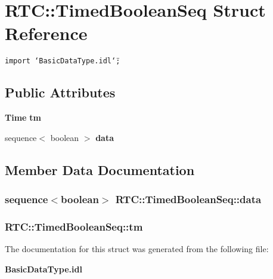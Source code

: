 \section{RTC::Timed\-Boolean\-Seq Struct Reference}
\label{structRTC_1_1TimedBooleanSeq}
{\tt import \char`\"{}Basic\-Data\-Type.idl\char`\"{};}

\subsection*{Public Attributes}
\begin{CompactItemize}
\item 
{\bf Time} {\bf tm}
\item 
sequence$<$ boolean $>$ {\bf data}
\end{CompactItemize}


\subsection{Member Data Documentation}
\subsubsection{\setlength{\rightskip}{0pt plus 5cm}sequence$<$boolean$>$ {\bf RTC::Timed\-Boolean\-Seq::data}}\label{structRTC_1_1TimedBooleanSeq_RTC_1_1TimedBooleanSeqo1}


\subsubsection{ {\bf RTC::Timed\-Boolean\-Seq::tm}}\label{structRTC_1_1TimedBooleanSeq_RTC_1_1TimedBooleanSeqo0}




The documentation for this struct was generated from the following file:\begin{CompactItemize}
\item 
{\bf Basic\-Data\-Type.idl}\end{CompactItemize}
